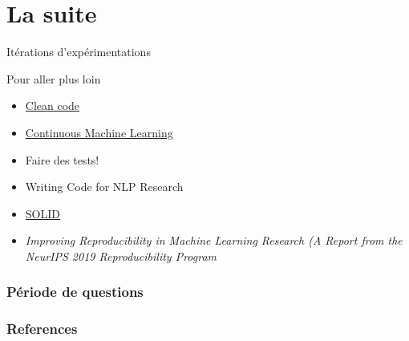 \documentclass[aspectratio=169,10pt,xcolor=x11names,english,french]{beamer}
\begin{document}
	\section{La suite}
	\begin{frame}
		\centering
		\fontsize{35}{35}\faRefresh\vfil
		\vspace{1em}
		\normalsize Itérations d'expérimentations
	\end{frame}
	
	\begin{frame}{Pour aller plus loin}
		\begin{itemize}
			\item \href{https://www.oreilly.com/library/view/clean-code-a/9780136083238/}{Clean code}
			\item \href{https://github.com/iterative/cml}{Continuous Machine Learning}
			\item Faire des tests!
			\item Writing Code for NLP Research \cite{gardner-etal-2018-writing}
			\item \href{https://www.youtube.com/watch?v=t86v3N4OshQ&list=LLFp5G_2HoipBrGaw9iAcPPw&index=693}{SOLID}
			\item \textit{Improving Reproducibility in Machine Learning Research (A Report from the NeurIPS 2019 Reproducibility Program} \cite{pineau2020improving}
		\end{itemize}
	\end{frame}
	
	\begin{frame}
		\frametitle{Période de questions}
		
		\centering
		\fontsize{100}{100}
		\faQuestion
		
	\end{frame}

	
	
	\begin{frame}[t, allowframebreaks]
		\frametitle{References}
		
		
	\end{frame}
	
	
	
\end{document}
